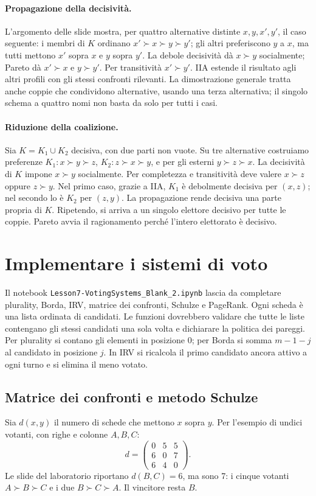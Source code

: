 \paragraph{Propagazione della decisività.} L'argomento delle slide mostra, per quattro alternative distinte $x,y,x',y'$, il caso seguente: i membri di $K$ ordinano $x'\succ x\succ y\succ y'$; gli altri preferiscono $y$ a $x$, ma tutti mettono $x'$ sopra $x$ e $y$ sopra $y'$. La debole decisività dà $x\succ y$ socialmente; Pareto dà $x'\succ x$ e $y\succ y'$. Per transitività $x'\succ y'$. IIA estende il risultato agli altri profili con gli stessi confronti rilevanti. La dimostrazione generale tratta anche coppie che condividono alternative, usando una terza alternativa; il singolo schema a quattro nomi non basta da solo per tutti i casi.

\paragraph{Riduzione della coalizione.} Sia $K=K_1\cup K_2$ decisiva, con due parti non vuote. Su tre alternative costruiamo preferenze $K_1:x\succ y\succ z$, $K_2:z\succ x\succ y$, e per gli esterni $y\succ z\succ x$. La decisività di $K$ impone $x\succ y$ socialmente. Per completezza e transitività deve valere $x\succ z$ oppure $z\succ y$. Nel primo caso, grazie a IIA, $K_1$ è debolmente decisiva per $(x,z)$; nel secondo lo è $K_2$ per $(z,y)$. La propagazione rende decisiva una parte propria di $K$. Ripetendo, si arriva a un singolo elettore decisivo per tutte le coppie. Pareto avvia il ragionamento perché l'intero elettorato è decisivo.

\section{Implementare i sistemi di voto}
Il notebook \texttt{Lesson7-VotingSystems\_Blank\_2.ipynb} lascia da completare plurality, Borda, IRV, matrice dei confronti, Schulze e PageRank. Ogni scheda è una lista ordinata di candidati. Le funzioni dovrebbero validare che tutte le liste contengano gli stessi candidati una sola volta e dichiarare la politica dei pareggi. Per plurality si contano gli elementi in posizione 0; per Borda si somma $m-1-j$ al candidato in posizione $j$. In IRV si ricalcola il primo candidato ancora attivo a ogni turno e si elimina il meno votato.

\subsection{Matrice dei confronti e metodo Schulze}
Sia $d(x,y)$ il numero di schede che mettono $x$ sopra $y$. Per l'esempio di undici votanti, con righe e colonne $A,B,C$:
\[ d=\begin{pmatrix}0&5&5\\6&0&7\\6&4&0\end{pmatrix}. \]
Le slide del laboratorio riportano $d(B,C)=6$, ma sono 7: i cinque votanti $A\succ B\succ C$ e i due $B\succ C\succ A$. Il vincitore resta $B$.

